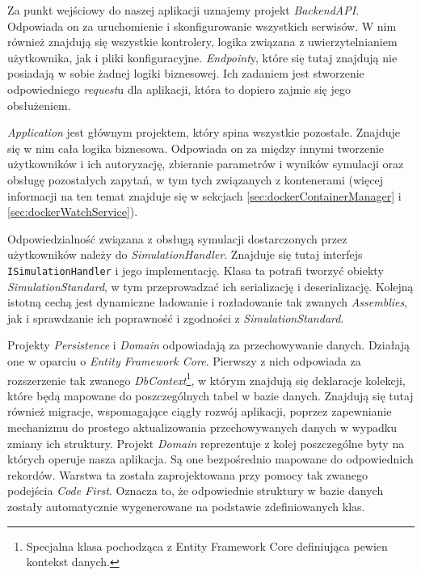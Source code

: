 \par Za punkt wejściowy do naszej aplikacji uznajemy projekt \emph{BackendAPI}. Odpowiada on za uruchomienie i skonfigurowanie wszystkich serwisów. W nim również znajdują się wszystkie kontrolery, logika związana z uwierzytelnianiem użytkownika, jak i pliki konfiguracyjne. \emph{Endpoint}y, które się tutaj znajdują nie posiadają w sobie żadnej logiki biznesowej. Ich zadaniem jest stworzenie odpowiedniego \emph{request}u dla aplikacji, która to dopiero zajmie się jego obsłużeniem.

\par \emph{Application} jest głównym projektem, który spina wszystkie pozostałe. Znajduje się w nim cała logika biznesowa. Odpowiada on za między innymi tworzenie użytkowników i ich autoryzację, zbieranie parametrów i wyników symulacji oraz obsługę pozostałych zapytań, w tym tych związanych z kontenerami (więcej informacji na ten temat znajduje się w sekcjach \ref{sec:dockerContainerManager} i \ref{sec:dockerWatchService}).

\par Odpowiedzialność związana z obsługą symulacji dostarczonych przez użytkowników należy do \emph{SimulationHandler}. Znajduje się tutaj interfejs \texttt{ISimulationHandler} i jego implementację. Klasa ta potrafi tworzyć obiekty \emph{SimulationStandard}, w tym przeprowadzać ich serializację i deserializację. Kolejną istotną cechą jest dynamiczne ładowanie i rozładowanie tak zwanych \emph{Assemblies}, jak i sprawdzanie ich poprawność i zgodności z \emph{SimulationStandard}.

\par Projekty \emph{Persistence} i \emph{Domain} odpowiadają za przechowywanie danych. Działają one w oparciu o \emph{Entity Framework Core}. Pierwszy z nich odpowiada za rozszerzenie tak zwanego \emph{DbContext}\footnote{Specjalna klasa pochodząca z Entity Framework Core definiująca pewien kontekst danych.}, w którym znajdują się deklaracje kolekcji, które będą mapowane do poszczególnych tabel w bazie danych. Znajdują się tutaj również migracje, wspomagające ciągły rozwój aplikacji, poprzez zapewnianie mechanizmu do prostego aktualizowania przechowywanych danych w wypadku zmiany ich struktury. Projekt \emph{Domain} reprezentuje z kolej poszczególne byty na których operuje nasza aplikacja. Są one bezpośrednio mapowane do odpowiednich rekordów. Warstwa ta została zaprojektowana przy pomocy tak zwanego podejścia \emph{Code First}. Oznacza to, że odpowiednie struktury w bazie danych zostały automatycznie wygenerowane na podstawie zdefiniowanych klas.

